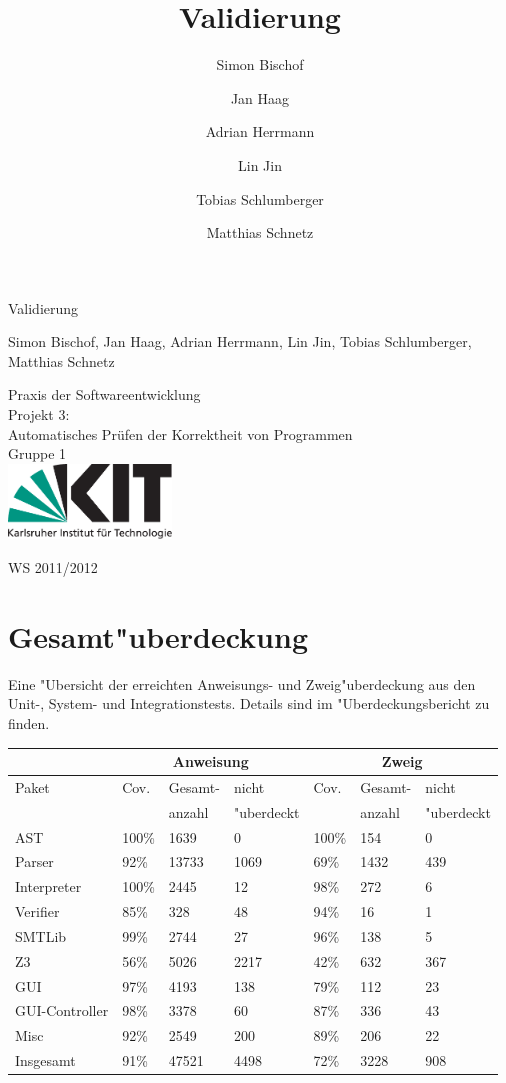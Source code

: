 \documentclass[10pt,a4paper,titlepage]{article}
\title{Validierung}
\author{Simon Bischof \and Jan Haag \and Adrian Herrmann \and Lin Jin \and Tobias Schlumberger \and Matthias Schnetz}
\begin{document}
\thispagestyle{empty}
\vspace*{4cm}
\begin{center}
\begin {huge}
Validierung\\
\end{huge}
Simon Bischof, Jan Haag, Adrian Herrmann, Lin Jin, Tobias Schlumberger, Matthias Schnetz\\
\vspace{3cm}
\begin{huge}
Praxis der Softwareentwicklung \\
Projekt 3:\\
Automatisches Pr\"{u}fen der Korrektheit von Programmen\\
Gruppe 1\\
\vspace{2cm}
\includegraphics[height=2cm]{images/Logo.pdf}\\[0.5cm]
\end{huge}
\begin{huge}
WS 2011/2012
\end{huge}
\end{center}
\newpage
\tableofcontents
\newpage

\section{Gesamt"uberdeckung}
Eine "Ubersicht der erreichten Anweisungs- und Zweig"uberdeckung aus den Unit-, System- und Integrationstests. Details sind im "Uberdeckungsbericht zu finden. \\[0.5cm]
\begin{tabular}{|p{3cm}|p{1.5cm}|p{2.5cm}|p{1.5cm}|p{1.5cm}|p{2.5cm}|p{1.5cm}|}
\hline
& \multicolumn{3}{c|}{Anweisung} & \multicolumn{3}{c|}{Zweig} \\ 
\hline
Paket&Cov.&Gesamt-&nicht&Cov.&Gesamt-&nicht\\
&&anzahl&"uberdeckt&&anzahl&"uberdeckt \\\hline
AST&100\%&1639&0&100\%&154&0 \\\hline
Parser&92\%&13733&1069&69\%&1432&439 \\\hline
Interpreter&100\%&2445&12&98\%&272&6 \\\hline
Verifier&85\%&328&48&94\%&16&1 \\\hline
SMTLib&99\%&2744&27&96\%&138&5 \\\hline
Z3&56\%&5026&2217&42\%&632&367 \\\hline
GUI&97\%&4193&138&79\%&112&23 \\\hline
GUI-Controller&98\%&3378&60&87\%&336&43 \\\hline
Misc&92\%&2549&200&89\%&206&22 \\\hline
Insgesamt&91\%&47521&4498&72\%&3228&908 \\\hline
\end{tabular}
\end{document}
